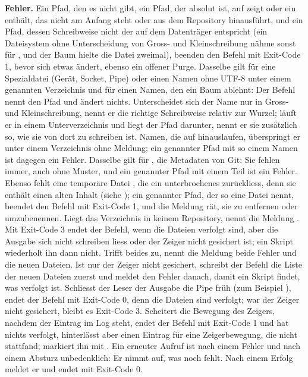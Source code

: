 {\bf Fehler.} Ein Pfad, den es nicht gibt, ein Pfad, der absolut ist, auf  zeigt
oder ein  enthält, das nicht am Anfang steht oder aus dem Repository hinausführt,
und ein Pfad, dessen Schreibweise nicht der auf dem Datenträger entspricht
(ein Dateisystem ohne Unterscheidung von Gross- und Kleinschreibung nähme sonst  für
, und der Baum hielte die Datei zweimal), beenden den Befehl mit Exit-Code 1, bevor sich
etwas ändert, ebenso ein offener Purge. Dasselbe gilt für eine Spezialdatei (Gerät, Socket, Pipe)
oder einen Namen ohne UTF-8 unter einem genannten Verzeichnis und für einen Namen, den ein Baum
ablehnt: Der Befehl nennt den Pfad und ändert nichts.
Unterscheidet sich der Name nur in Gross- und Kleinschreibung, nennt er die richtige Schreibweise
relativ zur Wurzel; läuft er in einem Unterverzeichnis und liegt der Pfad darunter,
nennt er sie zusätzlich so, wie sie von dort zu schreiben ist.
Namen, die auf  hinauslaufen,
überspringt er unter einem Verzeichnis ohne Meldung; ein genannter Pfad mit so einem Namen ist
dagegen ein Fehler. Dasselbe gilt für , die Metadaten von Git:
Sie fehlen immer, auch ohne Muster, und ein genannter Pfad mit einem Teil  ist ein
Fehler. Ebenso fehlt eine temporäre Datei , die ein unterbrochenes
 zurückliess, denn sie enthält einen alten Inhalt (siehe ); ein
genannter Pfad, der so eine Datei nennt, beendet den Befehl mit Exit-Code 1, und die Meldung rät,
sie zu entfernen oder umzubenennen.
Liegt das Verzeichnis in keinem Repository, nennt die Meldung .
Mit Exit-Code 3 endet der Befehl, wenn
die Dateien verfolgt sind, aber die Ausgabe sich nicht schreiben liess oder der Zeiger nicht
gesichert ist; ein Skript wiederholt ihn dann nicht. Trifft beides zu, nennt die Meldung beide
Fehler und die neuen Dateien. Ist nur der Zeiger nicht gesichert, schreibt
der Befehl die Liste der neuen Dateien zuerst und meldet den Fehler danach, damit ein Skript findet,
was verfolgt ist. Schliesst der Leser der Ausgabe die Pipe früh (zum Beispiel ), endet
der Befehl mit Exit-Code 0, denn die Dateien sind verfolgt;
war der Zeiger nicht gesichert, bleibt es Exit-Code 3.
Scheitert die Bewegung des Zeigers,
nachdem der Eintrag im Log steht, endet der Befehl mit Exit-Code 1 und hat nichts verfolgt,
hinterlässt aber einen Eintrag für eine Zeigerbewegung, die nicht stattfand;
 markiert ihn mit \type{!}.
Ein erneuter Aufruf ist nach einem Fehler und nach einem Absturz unbedenklich:
Er nimmt auf, was noch fehlt. Nach einem Erfolg meldet er 
und endet mit Exit-Code 0.

